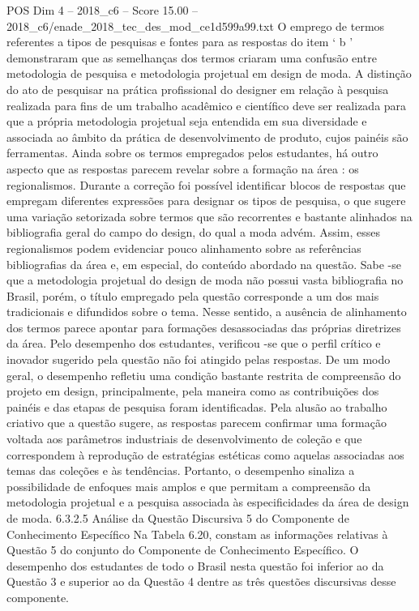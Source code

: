 \begin{textsample}{POS Dim 4 – 2018\_c6 – Score 15.00 – 2018\_c6/enade\_2018\_tec\_des\_mod\_ce1d599a99.txt}
O emprego de termos referentes a tipos de pesquisas e fontes para as respostas do item ‘ b ’ demonstraram que as semelhanças dos termos criaram uma confusão entre metodologia de pesquisa e metodologia projetual em design de moda.
A distinção do ato de pesquisar na prática profissional do designer em relação à pesquisa realizada para fins de um trabalho acadêmico e científico deve ser realizada para que a própria metodologia projetual seja entendida em sua diversidade e associada ao âmbito da prática de desenvolvimento de produto, cujos painéis são ferramentas.
Ainda sobre os termos empregados pelos estudantes, há outro aspecto que as respostas parecem revelar sobre a formação na área : os regionalismos.
Durante a correção foi possível identificar blocos de respostas que empregam diferentes expressões para designar os tipos de pesquisa, o que sugere uma variação setorizada sobre termos que são recorrentes e bastante alinhados na bibliografia geral do campo do design, do qual a moda advém.
Assim, esses regionalismos podem evidenciar pouco alinhamento sobre as referências bibliografias da área e, em especial, do conteúdo abordado na questão.
Sabe -se que a metodologia projetual do design de moda não possui vasta bibliografia no Brasil, porém, o título empregado pela questão corresponde a um dos mais tradicionais e difundidos sobre o tema.
Nesse sentido, a ausência de alinhamento dos termos parece apontar para formações desassociadas das próprias diretrizes da área.
Pelo desempenho dos estudantes, verificou -se que o perfil crítico e inovador sugerido pela questão não foi atingido pelas respostas.
De um modo geral, o desempenho refletiu uma condição bastante restrita de compreensão do projeto em design, principalmente, pela maneira como as contribuições dos painéis e das etapas de pesquisa foram identificadas.
Pela alusão ao trabalho criativo que a questão sugere, as respostas parecem confirmar uma formação voltada aos parâmetros industriais de desenvolvimento de coleção e que correspondem à reprodução de estratégias estéticas como aquelas associadas aos temas das coleções e às tendências.
Portanto, o desempenho sinaliza a possibilidade de enfoques mais amplos e que permitam a compreensão da metodologia projetual e a pesquisa associada às especificidades da área de design de moda. 6.3.2.5 Análise da Questão Discursiva 5 do Componente de Conhecimento Específico Na Tabela 6.20, constam as informações relativas à Questão 5 do conjunto do Componente de Conhecimento Específico.
O desempenho dos estudantes de todo o Brasil nesta questão foi inferior ao da Questão 3 e superior ao da Questão 4 dentre as três questões discursivas desse componente.

\end{textsample}
